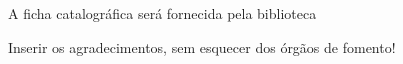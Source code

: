 \documentclass[
	oldfontcommands,
	sumario=abnt-6027-2012,
	12pt,			%
	openright,		%
	oneside,		%
	a4paper,		%
	english,		%
	brazil			%
	]{imecc-unicamp}
\begin{document}
\begin{fichacatalografica}
    \begin{center}
	{\ABNTEXchapterfont\large A ficha catalográfica será fornecida pela biblioteca}
    \end{center}
%     
\end{fichacatalografica}
\begin{folhadeaprovacao}
%     
\end{folhadeaprovacao}
\begin{agradecimentos}
Inserir os agradecimentos, sem esquecer dos órgãos de fomento!
\end{agradecimentos}
\end{document}
